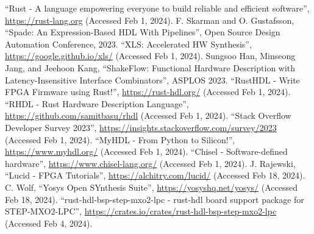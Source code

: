 \documentclass[sigplan,screen,sigconf]{acmart}
\begin{document}
\begin{thebibliography}{00}
   ``Rust - A language empowering everyone to build reliable and efficient software'', \url{https://rust-lang.org} (Accessed Feb 1, 2024).
   F. Skarman and O. Gustafsson, ``Spade: An Expression-Based HDL With Pipelines'', Open Source Design Automation Conference, 2023.
   ``XLS: Accelerated HW Synthesis'', \url{https://google.github.io/xls/} (Accessed Feb 1, 2024).
   Sungsoo Han, Minseong Jang, and Jeehoon Kang, ``ShakeFlow: Functional Hardware Description with Latency-Insensitive Interface Combinators'', ASPLOS 2023.
   ``RustHDL - Write FPGA Firmware using Rust!'', \url{https://rust-hdl.org/} (Accessed Feb 1, 2024).
   ``RHDL - Rust Hardware Description Language'', \url{https://github.com/samitbasu/rhdl} (Accessed Feb 1, 2024).
   ``Stack Overflow Developer Survey 2023'', \url{https://insights.stackoverflow.com/survey/2023} (Accessed Feb 1, 2024).
   ``MyHDL - From Python to Silicon!'', \url{https://www.myhdl.org/} (Accessed Feb 1, 2024).
   ``Chisel - Software-defined hardware'', \url{https://www.chisel-lang.org/} (Accessed Feb 1, 2024).
   J. Rajewski, ``Lucid - FPGA Tutorials'', \url{https://alchitry.com/lucid/} (Accessed Feb 18, 2024).
   C. Wolf, ``Yosys Open SYnthesis Suite'', \url{https://yosyshq.net/yosys/} (Accessed Feb 18, 2024).
   ``rust-hdl-bsp-step-mxo2-lpc - rust-hdl board support package for STEP-MXO2-LPC'', \url{https://crates.io/crates/rust-hdl-bsp-step-mxo2-lpc} (Accessed Feb 4, 2024).
\end{thebibliography}
\end{document}
